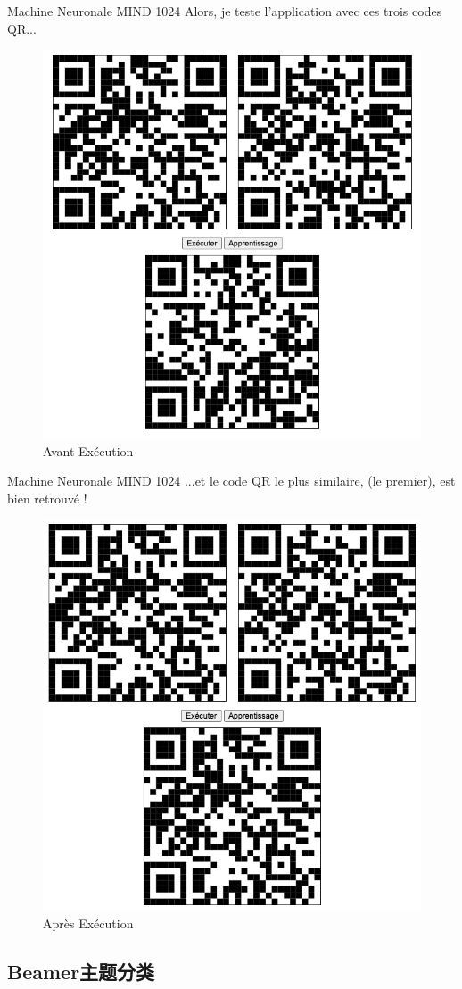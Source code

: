 \documentclass{beamer}
\begin{document}
\begin{frame}{Machine Neuronale MIND 1024}
    Alors, je teste l'application avec ces trois codes QR...
    \begin{figure}
        \centering
        \includegraphics[width=0.6\linewidth]{pic/qrinput.png}
        \caption{Avant Exécution}
    \end{figure}
\end{frame}

\begin{frame}{Machine Neuronale MIND 1024}
    ...et le code QR le plus similaire, (le premier), est bien retrouvé !
    \begin{figure}
        \centering
        \includegraphics[width=0.6\linewidth]{pic/qroutput.png}
        \caption{Après Exécution}
    \end{figure}
\end{frame}

\iffalse
\subsection{Beamer主题分类}
\end{document}
